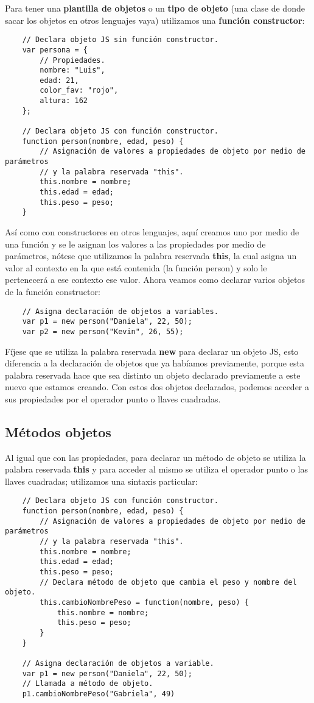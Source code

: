 Para tener una \textbf{plantilla de objetos} o un \textbf{tipo de objeto} (una clase de donde sacar los objetos en otros lenguajes vaya) utilizamos una \textbf{función constructor}:
\begin{lstlisting}
    // Declara objeto JS sin función constructor.
    var persona = {
        // Propiedades.
        nombre: "Luis",
        edad: 21,
        color_fav: "rojo",
        altura: 162
    };

    // Declara objeto JS con función constructor.
    function person(nombre, edad, peso) {
        // Asignación de valores a propiedades de objeto por medio de parámetros
        // y la palabra reservada "this".
        this.nombre = nombre;
        this.edad = edad;
        this.peso = peso;
    }
\end{lstlisting}

Así como con constructores en otros lenguajes, aquí creamos uno por medio de una función y se le asignan los valores a las propiedades por medio de parámetros, nótese que utilizamos la palabra reservada \textbf{this}, la cual asigna un valor al contexto en la que está contenida (la función person) y solo le pertenecerá a ese contexto ese valor. Ahora veamos como declarar varios objetos de la función constructor:
\begin{lstlisting}
    // Asigna declaración de objetos a variables.
    var p1 = new person("Daniela", 22, 50);
    var p2 = new person("Kevin", 26, 55);
\end{lstlisting}

Fíjese que se utiliza la palabra reservada \textbf{new} para declarar un objeto JS, esto diferencia a la declaración de objetos que ya habíamos previamente, porque esta palabra reservada hace que sea distinto un objeto declarado previamente a este nuevo que estamos creando. Con estos dos objetos declarados, podemos acceder a sus propiedades por el operador punto o llaves cuadradas.


\subsection{Métodos objetos}

Al igual que con las propiedades, para declarar un método de objeto se utiliza la palabra reservada \textbf{this} y para acceder al mismo se utiliza el operador punto o las llaves cuadradas; utilizamos una sintaxis particular:
\begin{lstlisting}
    // Declara objeto JS con función constructor.
    function person(nombre, edad, peso) {
        // Asignación de valores a propiedades de objeto por medio de parámetros
        // y la palabra reservada "this".
        this.nombre = nombre;
        this.edad = edad;
        this.peso = peso;
        // Declara método de objeto que cambia el peso y nombre del objeto.
        this.cambioNombrePeso = function(nombre, peso) {
            this.nombre = nombre;
            this.peso = peso;
        }
    }

    // Asigna declaración de objetos a variable.
    var p1 = new person("Daniela", 22, 50);
    // Llamada a método de objeto.
    p1.cambioNombrePeso("Gabriela", 49)
\end{lstlisting}

